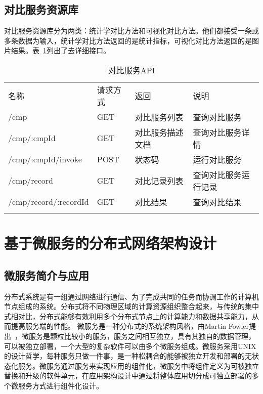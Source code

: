 \subsection{对比服务资源库}
对比服务资源库分为两类：统计学对比方法和可视化对比方法。他们都接受一条或多条数据为输入，统计学对比方法返回的是统计指标，可视化对比方法返回的是图片结果。表~\ref{tab:cmp-service-API}列出了去详细接口。

\begin{table}[!htbp]
    \centering
    \caption{对比服务API}
    \label{tab:cmp-service-API}
    \begin{tabular}{llll}
        \Xhline{1.5pt}
        名称 & 请求方式 & 返回 & 说明 \\
        \Xhline{1.5pt}
        /cmp & GET & 对比服务列表 & 查询对比服务 \\
        /cmp/:cmpId & GET & 对比服务描述文档 & 查询对比服务详情 \\
        /cmp/:cmpId/invoke & POST & 状态码 & 运行对比服务 \\ 
        /cmp/record & GET & 对比记录列表 & 查询对比服务运行记录 \\
        /cmp/record/:recordId & GET & 对比结果 & 查询对比结果 \\
        \Xhline{1.5pt}
    \end{tabular}
\end{table}

\section{基于微服务的分布式网络架构设计}
\subsection{微服务简介与应用}
分布式系统是有一组通过网络进行通信、为了完成共同的任务而协调工作的计算机节点组成的系统。分布式将不同物理区域的计算资源组织整合起来，与传统的集中式相对比，分布式能够有效利用多个分布式节点上的计算能力和数据共享能力，从而提高服务端的性能。
微服务是一种分布式的系统架构风格，由Martin Fowler提出~\cite{fowler2014microservices}，微服务是颗粒比较小的服务，服务之间相互独立，具有其独自的数据管理，可以被独立部署，一个大型的复杂软件可以由多个微服务组成。微服务采用UNIX的设计哲学，每种服务只做一件事，是一种松耦合的能够被独立开发和部署的无状态化服务。微服务通过服务来实现应用的组件化，微服务中将组件定义为可被独立替换和升级的软件单元，在应用架构设计中通过将整体应用切分成可独立部署的多个微服务方式进行组件化设计。

